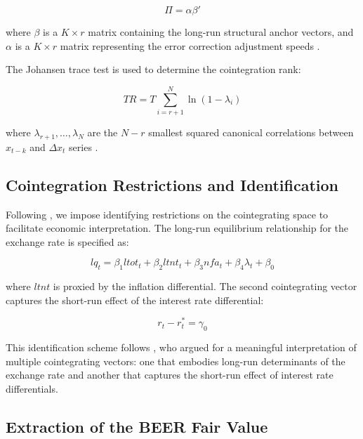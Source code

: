 \documentclass[11pt,a4paper]{article}
\begin{document}
\begin{equation}
\Pi = \alpha \beta'
\label{eq:pi_factorization}
\end{equation}

where $\beta$ is a $K \times r$ matrix containing the long-run structural anchor vectors, and $\alpha$ is a $K \times r$ matrix representing the error correction adjustment speeds \citep{Johansen1995}.

The Johansen trace test is used to determine the cointegration rank:

\begin{equation}
TR = T\sum_{i=r+1}^{N} \ln(1 - \lambda_i)
\label{eq:trace_test}
\end{equation}

where $\lambda_{r+1}, \dots, \lambda_N$ are the $N-r$ smallest squared canonical correlations between $x_{t-k}$ and $\Delta x_t$ series \citep{Johansen1995, ClarkMacDonald1998}.

\subsection{Cointegration Restrictions and Identification}

Following \cite{ClarkMacDonald1998}, we impose identifying restrictions on the cointegrating space to facilitate economic interpretation. The long-run equilibrium relationship for the exchange rate is specified as:

\begin{equation}
lq_t = \beta_1 ltot_t + \beta_2 ltnt_t + \beta_3 nfa_t + \beta_4 \lambda_t + \beta_0
\label{eq:cointegrating_vector1}
\end{equation}

where $ltnt$ is proxied by the inflation differential. The second cointegrating vector captures the short-run effect of the interest rate differential:

\begin{equation}
r_t - r_t^* = \gamma_0
\label{eq:cointegrating_vector2}
\end{equation}

This identification scheme follows \cite{ClarkMacDonald1998}, who argued for a meaningful interpretation of multiple cointegrating vectors: one that embodies long-run determinants of the exchange rate and another that captures the short-run effect of interest rate differentials.

\subsection{Extraction of the BEER Fair Value}
\end{document}
